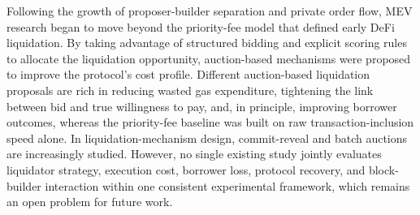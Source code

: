 \documentclass{llncs}
\begin{document}
Following the growth of proposer-builder separation and private order
flow, MEV research began to move beyond the priority-fee model that
defined early DeFi liquidation. By taking advantage of structured
bidding and explicit scoring rules to allocate the liquidation
opportunity, auction-based mechanisms were proposed to improve the
protocol's cost profile. Different auction-based liquidation proposals
are rich in reducing wasted gas expenditure, tightening the link between
bid and true willingness to pay, and, in principle, improving borrower
outcomes, whereas the priority-fee baseline was built on raw
transaction-inclusion speed alone. In liquidation-mechanism design,
commit-reveal and batch auctions are increasingly studied. However,
no single existing study jointly evaluates liquidator strategy,
execution cost, borrower loss, protocol recovery, and block-builder
interaction within one consistent experimental framework, which remains
an open problem for future work.
\end{document}
